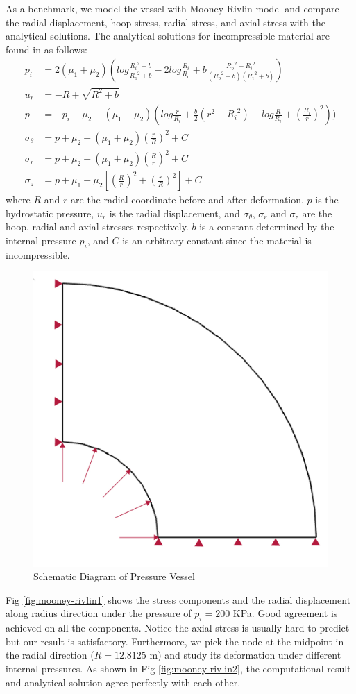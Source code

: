 As a benchmark, we model the vessel with Mooney-Rivlin model and compare the radial displacement, hoop stress, radial stress, and axial stress with the analytical solutions. The analytical solutions for incompressible material are found in \cite{Green} as follows: 
\begin{subequations}
\begin{align}
p_i &= 2(\mu_1 + \mu_2)(log\frac{{R_i}^2 + b}{{R_o}^2 + b} - 2log\frac{R_i}{R_o} +
b\frac{{R_o}^2 - {R_i}^2}{({R_o}^2+b)({R_i}^2+b)}) \\
u_r &= -R + \sqrt{R^2 + b} \\
p &= - p_i - \mu_2 - (\mu_1 + \mu_2)(log\frac{r}{R_i} + \frac{b}{2}(r^2 - {R_i}^2) - log\frac{R}{R_i} + {(\frac{R_i}{r})}^2) ) \\
\sigma_{\theta} &= p + \mu_2 + (\mu_1 + \mu_2)(\frac{r}{R})^2 + C \\
\sigma_r &= p + \mu_2 + (\mu_1 + \mu_2)(\frac{R}{r})^2 + C \\
\sigma_z &= p +  \mu_1 + \mu_2[(\frac{R}{r})^2 + (\frac{r}{R})^2] + C
\end{align}
\end{subequations}
where $R$ and $r$ are the radial coordinate before and after deformation, $p$ is the hydrostatic pressure, $u_r$ is the radial displacement, and $\sigma_{\theta}$, $\sigma_r$ and $\sigma_z$ are the hoop, radial and axial stresses respectively. $b$ is a constant determined by the internal pressure $p_i$, and $C$ is an arbitrary constant since the material is incompressible. 

\begin{figure}[h!]
\centering
\includegraphics[width=.3\textwidth]{./figures/vessel_schematic.jpg}
\caption{Schematic Diagram of Pressure Vessel}
\label{fig:vessel_schematic}
\end{figure}

Fig \ref{fig:mooney-rivlin1} shows the stress components and the radial displacement along radius direction under the pressure of $p_i = 200$ KPa. Good agreement is achieved on all the components. Notice the axial stress is usually hard to predict but our result is satisfactory. Furthermore, we pick the node at the midpoint in the radial direction ($R = 12.8125$ m) and study its deformation under different internal pressures. As shown in Fig \ref{fig:mooney-rivlin2}, the computational result and analytical solution agree perfectly with each other. 

